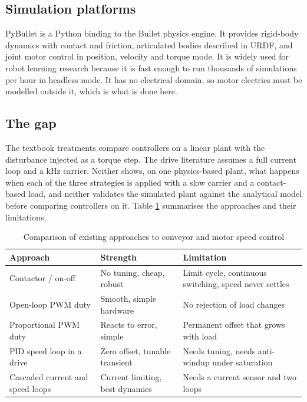 \documentclass[12pt,a4paper]{article}
\begin{document}
\subsection{Simulation platforms}

PyBullet \cite{pybullet} is a Python binding to the Bullet physics engine. It provides rigid-body dynamics with contact and friction, articulated bodies described in URDF, and joint motor control in position, velocity and torque mode. It is widely used for robot learning research because it is fast enough to run thousands of simulations per hour in headless mode. It has no electrical domain, so motor electrics must be modelled outside it, which is what is done here.

\subsection{The gap}

The textbook treatments compare controllers on a linear plant with the disturbance injected as a torque step. The drive literature assumes a full current loop and a kHz carrier. Neither shows, on one physics-based plant, what happens when each of the three strategies is applied with a slow carrier and a contact-based load, and neither validates the simulated plant against the analytical model before comparing controllers on it. Table \ref{tab:approaches} summarises the approaches and their limitations.

\begin{table}[htbp]
\centering
\caption{Comparison of existing approaches to conveyor and motor speed control}
\label{tab:approaches}
\begin{tabular}{|p{3.6cm}|p{4.4cm}|p{5.0cm}|}
\hline
\textbf{Approach} & \textbf{Strength} & \textbf{Limitation} \\ \hline
Contactor / on-off \cite{astrom-murray} & No tuning, cheap, robust & Limit cycle, continuous switching, speed never settles \\ \hline
Open-loop PWM duty \cite{mohan} & Smooth, simple hardware & No rejection of load changes \\ \hline
Proportional PWM duty & Reacts to error, simple & Permanent offset that grows with load \\ \hline
PID speed loop in a drive \cite{hughes, leonhard} & Zero offset, tunable transient & Needs tuning, needs anti-windup under saturation \\ \hline
Cascaded current and speed loops \cite{krishnan} & Current limiting, best dynamics & Needs a current sensor and two loops \\ \hline
\end{tabular}
\end{table}
\end{document}

